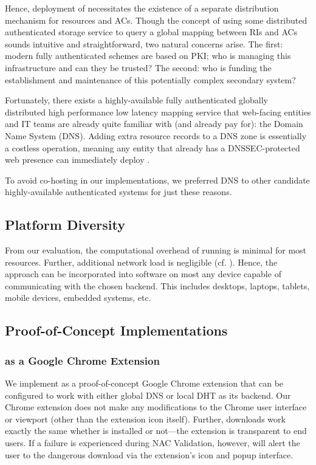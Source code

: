 Hence, deployment of \SYSTEM{} necessitates the existence of a separate
distribution mechanism for resources and ACs. Though the concept of using some
distributed authenticated storage service to query a global mapping between RIs
and ACs sounds intuitive and straightforward, two natural concerns arise. The
first: modern fully authenticated schemes are based on PKI; who is managing
this infrastructure and can they be trusted? The second: who is funding the
establishment and maintenance of this potentially complex secondary system?

Fortunately, there exists a highly-available fully authenticated globally
distributed high performance low latency mapping service that web-facing
entities and IT teams are already quite familiar with (and already pay for): the
Domain Name System (DNS). Adding extra resource records to a DNS zone is
essentially a costless operation, meaning any entity that already has a
DNSSEC-protected web presence can immediately deploy \SYSTEM{}.

To avoid co-hosting in our implementations, we preferred DNS to other candidate
highly-available authenticated systems for just these reasons.

\subsection{Platform Diversity}

From our evaluation, the computational overhead of running \SYSTEM{} is minimal
for most resources. Further, additional network load is negligible (cf.
). Hence, the \SYSTEM{} approach can be incorporated into
software on most any device capable of communicating with the chosen backend.
This includes desktops, laptops, tablets, mobile devices, embedded systems, etc.

\subsection{Proof-of-Concept Implementations}

\subsubsection{\SYSTEM{} as a Google Chrome Extension}

We implement \SYSTEM{} as a proof-of-concept Google Chrome extension that can
be configured to work with either global DNS or local DHT as its backend. Our
Chrome extension does not make any modifications to the Chrome user interface or
viewport (other than the extension icon itself). Further, downloads work exactly
the same whether \SYSTEM{} is installed or not---the extension is transparent to
end users. If a failure is experienced during NAC Validation, however, \SYSTEM{}
will alert the user to the dangerous download via the extension's icon and popup
interface.


